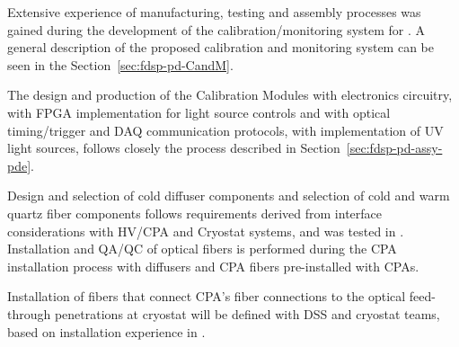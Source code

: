 Extensive experience of manufacturing, testing and assembly processes was gained during the development of the calibration/monitoring system for .
A general description of the proposed calibration and monitoring system can be seen in the Section~\ref{sec:fdsp-pd-CandM}. 

The design and production of the Calibration Modules with electronics circuitry, with FPGA implementation for light source controls and with optical timing/trigger and DAQ communication protocols, with implementation of UV light sources, follows closely the process described in Section~\ref{sec:fdsp-pd-assy-pde}.

Design and selection of cold diffuser components and selection of cold and warm quartz fiber components follows requirements derived from interface considerations with HV/CPA and Cryostat systems, and was tested in .
Installation and QA/QC of optical fibers is performed during the CPA installation process with diffusers and CPA fibers pre-installed with CPAs.

Installation of fibers that connect CPA's fiber connections to the optical feed-through penetrations at cryostat will be defined with DSS and cryostat teams, based on installation experience in . 
